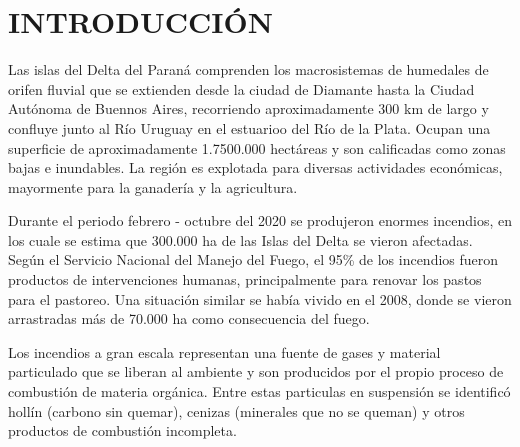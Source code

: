 \documentclass[10pt,twocolumn]{article}
\newcommand\cauthemail[1]{\footnotetext{#1}}
\newcommand{\esresumen}[1]{\small{#1 \par}\vspace{1.5ex}}
\newcommand{\pclaves}[1]{\small{\emph{#1} \par}\vspace{1.5ex}}
\newcommand{\enresumen}[1]{\small{#1 \par}\vspace{1.5ex}}
\newcommand{\keywords}[1]{\small{\emph{#1} \par}\vspace{1.5ex}}
\begin{document}
\renewcommand{\abstractname}{}
\twocolumn[
  \begin{@twocolumnfalse}
    \maketitle
    \begin{abstract}\vspace{-12ex}
      \centering\begin{minipage}{\dimexpr\paperwidth-6cm}

        \esresumen{-}
        \pclaves{-} %

        \enresumen{-}
        \keywords{-}  %

      \end{minipage}
      \vspace{4ex}
    \end{abstract}
  \end{@twocolumnfalse}
]
\thispagestyle{empty}

\setcounter{footnote}{1}
\cauthemail{}  %
\section{INTRODUCCIÓN}
Las islas del Delta del Paraná comprenden los macrosistemas de humedales de orifen fluvial que se extienden desde la ciudad de Diamante hasta la Ciudad Autónoma de Buennos Aires, recorriendo aproximadamente 300 km de largo y confluye junto al Río Uruguay en el estuarioo del Río de la Plata. Ocupan una superficie de aproximadamente 1.7500.000 hectáreas y son calificadas como zonas bajas e inundables.\cite{acuario_del_rio_parana} La región es explotada para diversas actividades económicas, mayormente para la ganadería y la agricultura. \cite{Galperin_2013}

Durante el periodo febrero - octubre del 2020 se produjeron enormes incendios, en los cuale se estima que 300.000 ha de las Islas del Delta se vieron afectadas.\cite{pagina_12} Según el Servicio Nacional del Manejo del Fuego, el 95\% de los incendios fueron productos de intervenciones humanas, principalmente para renovar los pastos para el pastoreo.\cite{SNMF_2020} Una situación similar se había vivido en el 2008, donde se vieron arrastradas más de 70.000 ha como consecuencia del fuego.\cite{quemas_2008}

Los incendios a gran escala representan una fuente de gases y material particulado que se liberan al ambiente y son producidos por el propio proceso de combustión de materia orgánica. Entre estas particulas en suspensión se identificó hollín (carbono sin quemar), cenizas (minerales que no se queman) y otros productos de combustión incompleta.\cite{molinas_2020,global_solar_uv_index_2002}
\end{document}
